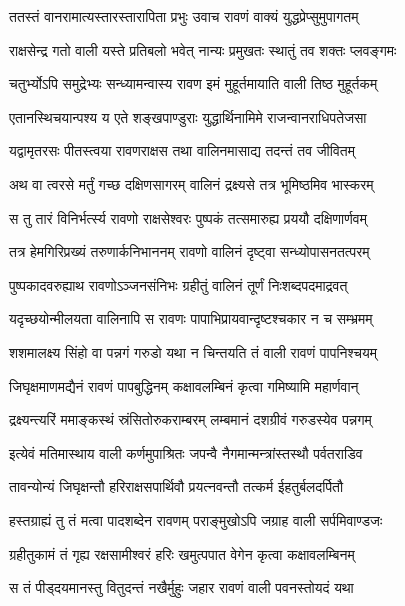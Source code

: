 \twolineshloka
{ततस्तं वानरामात्यस्तारस्तारापिता प्रभुः}
{उवाच रावणं वाक्यं युद्धप्रेप्सुमुपागतम्} %

\twolineshloka
{राक्षसेन्द्र गतो वाली यस्ते प्रतिबलो भवेत्}
{नान्यः प्रमुखतः स्थातुं तव शक्तः प्लवङ्गमः} %

\twolineshloka
{चतुर्भ्योऽपि समुद्रेभ्यः सन्ध्यामन्वास्य रावण}
{इमं मुहूर्तमायाति वाली तिष्ठ मुहूर्तकम्} %

\twolineshloka
{एतानस्थिचयान्पश्य य एते शङ्खपाण्डुराः}
{युद्धार्थिनामिमे राजन्वानराधिपतेजसा} %

\twolineshloka
{यद्वामृतरसः पीतस्त्वया रावणराक्षस}
{तथा वालिनमासाद्य तदन्तं तव जीवितम्} %

\twolineshloka
{अथ वा त्वरसे मर्तुं गच्छ दक्षिणसागरम्}
{वालिनं द्रक्ष्यसे तत्र भूमिष्ठमिव भास्करम्} %

\twolineshloka
{स तु तारं विनिर्भर्त्स्य रावणो राक्षसेश्वरः}
{पुष्पकं तत्समारुह्य प्रययौ दक्षिणार्णवम्} %

\twolineshloka
{तत्र हेमगिरिप्रख्यं तरुणार्कनिभाननम्}
{रावणो वालिनं दृष्ट्वा सन्ध्योपासनतत्परम्} %

\twolineshloka
{पुष्पकादवरुह्याथ रावणोऽञ्जनसंनिभः}
{ग्रहीतुं वालिनं तूर्णं निःशब्दपदमाद्रवत्} %

\twolineshloka
{यदृच्छयोन्मीलयता वालिनापि स रावणः}
{पापाभिप्रायवान्दृष्टश्चकार न च सम्भ्रमम्} %

\twolineshloka
{शशमालक्ष्य सिंहो वा पन्नगं गरुडो यथा}
{न चिन्तयति तं वाली रावणं पापनिश्चयम्} %

\twolineshloka
{जिघृक्षमाणमद्यैनं रावणं पापबुद्धिनम्}
{कक्षावलम्बिनं कृत्वा गमिष्यामि महार्णवान्} %

\twolineshloka
{द्रक्ष्यन्त्यरिं ममाङ्कस्थं स्रंसितोरुकराम्बरम्}
{लम्बमानं दशग्रीवं गरुडस्येव पन्नगम्} %

\twolineshloka
{इत्येवं मतिमास्थाय वाली कर्णमुपाश्रितः}
{जपन्वै नैगमान्मन्त्रांस्तस्थौ पर्वतराडिव} %

\twolineshloka
{तावन्योन्यं जिघृक्षन्तौ हरिराक्षसपार्थिवौ}
{प्रयत्नवन्तौ तत्कर्म ईहतुर्बलदर्पितौ} %

\twolineshloka
{हस्तग्राह्यं तु तं मत्वा पादशब्देन रावणम्}
{पराङ्मुखोऽपि जग्राह वाली सर्पमिवाण्डजः} %

\twolineshloka
{ग्रहीतुकामं तं गृह्य रक्षसामीश्वरं हरिः}
{खमुत्पपात वेगेन कृत्वा कक्षावलम्बिनम्} %

\twolineshloka
{स तं पीड्दयमानस्तु वितुदन्तं नखैर्मुहुः}
{जहार रावणं वाली पवनस्तोयदं यथा} %

